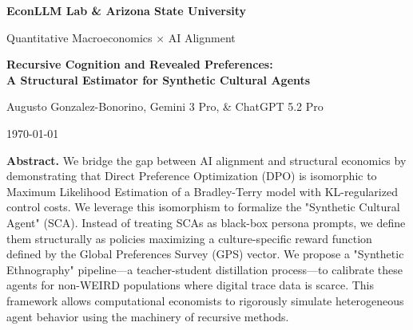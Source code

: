 \documentclass[11pt]{article}
\theoremstyle{plain}
\theoremstyle{definition}
\theoremstyle{remark}
\newcommand{\1}{\mathbf{1}}
\newcommand{\papertitle}{Recursive Cognition and Revealed Preferences:\\
A Structural Estimator for Synthetic Cultural Agents}
\newcommand{\paperauthor}{Augusto Gonzalez-Bonorino, Gemini 3 Pro, \& ChatGPT 5.2 Pro}
\newcommand{\paperaffil}{EconLLM Lab \& Arizona State University}
\newcommand{\paperdate}{\today}
\begin{document}
\nocite{*}

\begin{titlepage}
  \centering
  \vspace*{1.2cm}


  \vspace*{1.1cm}
  {\Large\color{white}\bfseries \paperaffil\par}
  \vspace{0.2cm}
  {\small\color{white}Quantitative Macroeconomics $\times$ AI Alignment\par}

  \vspace{2.2cm}
  {\Huge\bfseries \papertitle\par}
  \vspace{1.0cm}

  {\Large \paperauthor\par}
  \vspace{0.2cm}
  {\normalsize \paperdate\par}

  \vfill
  \begin{minipage}{0.92\textwidth}
  \noindent\textbf{Abstract.}
  We bridge the gap between AI alignment and structural economics by demonstrating that Direct Preference Optimization (DPO) is isomorphic to Maximum Likelihood Estimation of a Bradley-Terry model with KL-regularized control costs. We leverage this isomorphism to formalize the "Synthetic Cultural Agent" (SCA). Instead of treating SCAs as black-box persona prompts, we define them structurally as policies maximizing a culture-specific reward function defined by the Global Preferences Survey (GPS) vector. We propose a "Synthetic Ethnography" pipeline—a teacher-student distillation process—to calibrate these agents for non-WEIRD populations where digital trace data is scarce. This framework allows computational economists to rigorously simulate heterogeneous agent behavior using the machinery of recursive methods.
  \end{minipage}

  \vspace*{0.8cm}
\end{titlepage}
\end{document}
